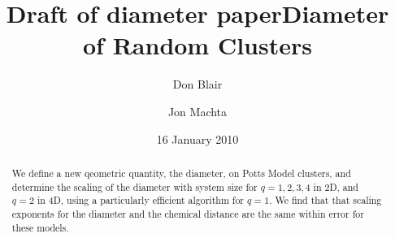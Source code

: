 \documentclass[pre,preprint,11pt]{revtex4}
\title{Draft of diameter paper}
\date{16 January 2010}
\begin{document}
\title{Diameter of Random Clusters}
\author{Don Blair}
\author{Jon Machta}
\begin {abstract}
We define a new qeometric quantity, the diameter, on Potts Model clusters, and determine the scaling of the diameter with system size for $q=1,2,3,4$ in 2D, and $q=2$ in 4D, using a particularly efficient algorithm for $q=1$.  We find that that scaling exponents for the diameter and the chemical distance are the same within error for these models.
\end{abstract}
\maketitle{}
 




\end{document}
